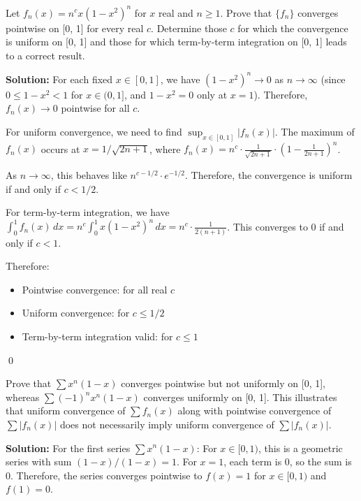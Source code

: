 \begin{problembox}
Let \( f_n(x) = n^c x(1 - x^2)^n \) for \( x \) real and \( n \geq 1 \). Prove that \( \{f_n\} \) converges pointwise on [0, 1] for every real \( c \). Determine those \( c \) for which the convergence is uniform on [0, 1] and those for which term-by-term integration on [0, 1] leads to a correct result.
\end{problembox}

\noindent\textbf{Solution:} For each fixed \( x \in [0, 1] \), we have \( (1 - x^2)^n \to 0 \) as \( n \to \infty \) (since \( 0 \leq 1 - x^2 < 1 \) for \( x \in (0, 1] \), and \( 1 - x^2 = 0 \) only at \( x = 1 \)). Therefore, \( f_n(x) \to 0 \) pointwise for all \( c \).

For uniform convergence, we need to find \( \sup_{x \in [0,1]} |f_n(x)| \). The maximum of \( f_n(x) \) occurs at \( x = 1/\sqrt{2n + 1} \), where \( f_n(x) = n^c \cdot \frac{1}{\sqrt{2n + 1}} \cdot \left(1 - \frac{1}{2n + 1}\right)^n \).

As \( n \to \infty \), this behaves like \( n^{c - 1/2} \cdot e^{-1/2} \). Therefore, the convergence is uniform if and only if \( c < 1/2 \).

For term-by-term integration, we have \( \int_0^1 f_n(x) \, dx = n^c \int_0^1 x(1 - x^2)^n \, dx = n^c \cdot \frac{1}{2(n + 1)} \). This converges to 0 if and only if \( c < 1 \).

Therefore:
\begin{itemize}
\item Pointwise convergence: for all real \( c \)
\item Uniform convergence: for \( c \le 1/2 \)
\item Term-by-term integration valid: for \( c \le 1 \)
\end{itemize}\qed


\begin{problembox}
Prove that \( \sum x^n (1 - x) \) converges pointwise but not uniformly on [0, 1], whereas \( \sum (-1)^n x^n (1 - x) \) converges uniformly on [0, 1]. This illustrates that uniform convergence of \( \sum f_n(x) \) along with pointwise convergence of \( \sum |f_n(x)| \) does not necessarily imply uniform convergence of \( \sum |f_n(x)| \).
\end{problembox}

\noindent\textbf{Solution:} For the first series \( \sum x^n (1 - x) \): For \( x \in [0, 1) \), this is a geometric series with sum \( (1 - x)/(1 - x) = 1 \). For \( x = 1 \), each term is 0, so the sum is 0. Therefore, the series converges pointwise to \( f(x) = 1 \) for \( x \in [0, 1) \) and \( f(1) = 0 \).

